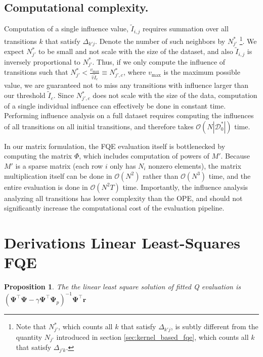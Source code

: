 \documentclass{article}
\newtheorem{proposition}{Proposition}
\begin{document}
\subsection{Computational complexity.} 
\label{appendix:kernel_fqe_complexity}

Computation of a single  influence value, $\tilde{I}_{i, j}$ requires summation over all transitions $k$ that satisfy $\Delta_{k'j}$. Denote the number of such neighbors by $N_{j'}^*$ \footnote{Note that $N_{j'}^*$, which counts all $k$ that satisfy $\Delta_{k'j}$, is subtly different from the quantity $N_{j'}$ introduced in section \ref{sec:kernel_based_fqe}, which counts all $k$ that satisfy $\Delta_{j'k}$.}. We expect $N_{j'}^*$ to be small and not scale with the size of the dataset, and also $\tilde{I}_{i, j}$ is inversely proportional to $N_{j'}^*$. Thus, if we only compute the influence of transitions such that $N_{j'}^* < \frac{v_{\text{max}}}{\hat{v}\tilde{I}_c} \equiv N_{j',c}^*$, where $v_{\text{max}}$ is the maximum possible value, we are guaranteed not to miss any transitions with influence larger than our threshold $\tilde{I}_c$. Since $N_{j',c}^*$ does not scale with the size of the data, computation of a single individual influence can effectively be done in constant time. Performing influence analysis on a full dataset requires computing the influences of all transitions on all initial transitions, and therefore takes $\mathcal{O}(N |\mathcal{D}^*_0|)$ time.

In our matrix formulation, the FQE evaluation itself is bottlenecked by computing the matrix $\Phi$, which includes computation of powers of $M'$. Because $M'$ is a sparse matrix (each row $i$ only has $N_i$ nonzero elements), the matrix multiplication itself can be done in $\mathcal{O}(N^2)$ rather than $\mathcal{O}(N^3)$ time, and the entire evaluation is done in $\mathcal{O}(N^2 T)$ time. Importantly, the influence analysis analyzing all transitions has lower complexity than the OPE, and should not significantly increase the computational cost of the evaluation pipeline.


\section{Derivations Linear Least-Squares FQE}
\label{appendix:ls_fqe}
\newcommand{\feature}{\pmb{\psi}}
\newcommand{\Feature}{\mathbf{\Psi}}
\begin{proposition}
\label{prop:ls_fqe}
The the linear least square solution of fitted Q evaluation is 
$
    (\Feature^\top \Feature - \gamma \Feature^\top \Feature_p)^{-1}\Feature^\top \mathbf{r}
$
\end{proposition}
\end{document}

